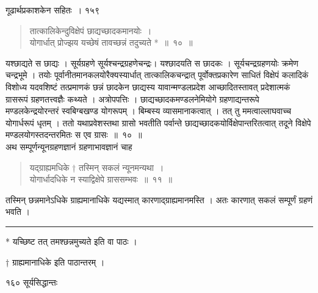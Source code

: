\documentclass[11pt, openany]{book}
\begin{document}
\newpage

 \hspace{3cm} गूढार्थप्रकाशकेन सहितः~। \hfill १५९
\vspace{1cm}


\begin{quote}
 {\ssi तात्कालिकेन्दुविक्षेपं छाद्यच्छादकमानयोः~।\\
योगार्धात् प्रोज्झय यच्छेषं तावच्छन्नं तदुच्यते *~॥~१०~॥}
\end{quote}


\begin{sloppypar}
 यश्छाद्यते स छाद्यः । सूर्यग्रहणे सूर्यश्चन्द्रग्रहणेचन्द्रः। यश्छादयति स छादकः । सूर्यचन्द्रग्रहणयोः क्रमेण चन्द्रभूमे । तयोः पूर्वानीतमानकलयोरैक्यस्यार्धात् तात्कालिकचन्द्रात् पूर्वोक्तप्रकारेण साधितं विक्षेपं कलादिकं विशोध्य यदवशिष्टं तत्प्रमाणकं छन्नं छादकेन छाद्यस्य यावान्मण्डलप्रदेश आच्छादितस्तावत् प्रदेशात्मकं ग्रासरूपं ग्रहणतत्त्वज्ञैः कथ्यते । अत्रोपपत्तिः । छाद्यच्छादकमण्डलनेमियोगे ग्रहणाद्यन्तरूपे मण्डलकेन्द्रयोरन्तरं स्वबिग्बखण्ड योगरूपम् । बिम्बस्य व्यासमानाकत्वात् । तत् तु ममत्वाल्लाघवाच्च योगार्धरूपं धृतम् । ततो यथाप्रवेशस्तथा ग्रासो भवतीति पर्वान्ते छाद्यच्छादकयोर्विक्षेपान्तरितत्वात् तदूने विक्षेपे मण्डलयोगस्तदन्तरमितः स एव ग्रासः~॥~१०~॥\\
 \noindent अथ सम्पूर्णन्यूनग्रहणज्ञानं ग्रहणाभावज्ञानं चाह\textendash
\end{sloppypar}


\begin{quote}
  {\ssi यद्ग्राह्यमधिके † तस्मिन् सकलं न्यूनमन्यथा~।\\
योगार्धादधिके न स्याद्विक्षेपे ग्राससम्भवः~॥~११~॥}
\end{quote}


तस्मिन् छन्नमानेऽधिके ग्राह्यमानाधिके यद्यस्मात् कारणाद्ग्राह्यमानमस्ति । अतः कारणात् सकलं सम्पूर्णं ग्रहणं भवति ।

\noindent \rule{\linewidth}{.5pt}

\begin{center}
 * यच्छिष्ट तत् तमश्छन्नमुच्यते इति वा पाठः ।
 
† ग्राह्यमानाधिके इति पाठान्तरम् ।
\end{center}


\newpage

\noindent १६० \hspace{4cm} सूर्यसिद्धान्तः
\vspace{1cm}
\end{document}

